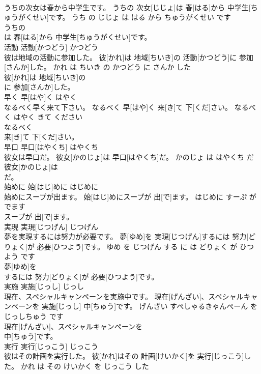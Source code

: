 \documentclass[8pt]{extreport}
\begin{document}
\begin{CJK}{UTF8}{min}
\\	うちの次女は春から中学生です。	うちの 次女[じじょ]は 春[はる]から 中学生[ちゅうがくせい]です。	うち の じじょ は はる から ちゅうがくせい です	
\\	うちの
\\	は 春[はる]から 中学生[ちゅうがくせい]です。			
\\	活動	活動[かつどう]	かつどう	
\\	彼は地域の活動に参加した。	彼[かれ]は 地域[ちいき]の 活動[かつどう]に 参加[さんか]した。	かれ は ちいき の かつどう に さんか した	
\\	彼[かれ]は 地域[ちいき]の
\\	に 参加[さんか]した。			
\\	早く	早[はや]く	はやく	
\\	なるべく早く来て下さい。	なるべく 早[はや]く 来[き]て 下[くだ]さい。	なるべく はやく きて ください	
\\	なるべく
\\	来[き]て 下[くだ]さい。			
\\	早口	早口[はやくち]	はやくち	
\\	彼女は早口だ。	彼女[かのじょ]は 早口[はやくち]だ。	かのじょ は はやくち だ	
\\	彼女[かのじょ]は
\\	だ。			
\\	始めに	始[はじ]めに	はじめに	
\\	始めにスープが出ます。	始[はじ]めにスープが 出[で]ます。	はじめに すーぷ が でます	
\\	スープが 出[で]ます。			
\\	実現	実現[じつげん]	じつげん	
\\	夢を実現するには努力が必要です。	夢[ゆめ]を 実現[じつげん]するには 努力[どりょく]が 必要[ひつよう]です。	ゆめ を じつげん する に は どりょく が ひつよう です	
\\	夢[ゆめ]を
\\	するには 努力[どりょく]が 必要[ひつよう]です。			
\\	実施	実施[じっし]	じっし	
\\	現在、スペシャルキャンペーンを実施中です。	現在[げんざい]、スペシャルキャンペーンを 実施[じっし] 中[ちゅう]です。	げんざい すぺしゃるきゃんぺーん を じっしちゅう です	
\\	現在[げんざい]、スペシャルキャンペーンを
\\	中[ちゅう]です。			
\\	実行	実行[じっこう]	じっこう	
\\	彼はその計画を実行した。	彼[かれ]はその 計画[けいかく]を 実行[じっこう]した。	かれ は その けいかく を じっこう した	

\end{CJK}
\end{document}
